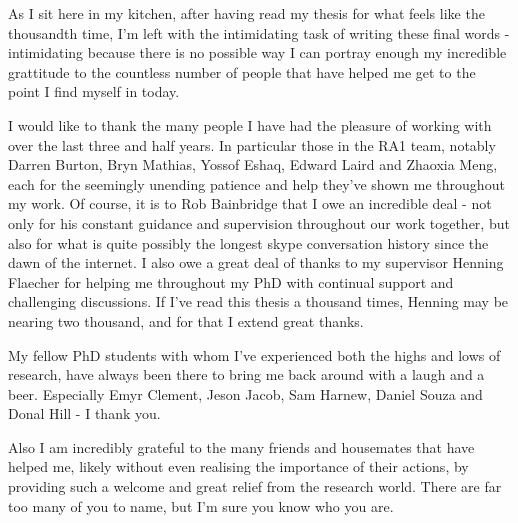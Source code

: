 
\begin{acknowledgements}      






\begin{spacing}{1}
As I sit here in my kitchen, after having read my thesis for what feels like
the
thousandth time, I'm left with the intimidating task of writing these final
words - intimidating because there is no possible way I can portray enough my
incredible grattitude to the countless number of people that have helped me
get to the point I find myself in today.

I would like to thank the many people I have had the pleasure of working with
over the last three and half years. In particular those in
the RA1 team, notably Darren Burton, Bryn Mathias, Yossof Eshaq, Edward
Laird and Zhaoxia Meng, each for the seemingly unending patience and help
they've shown me throughout my work. Of course, it is to Rob Bainbridge that I
owe an incredible deal - not only for his constant guidance and supervision
throughout our work together, but also for what is quite possibly the longest
skype conversation history since the dawn of the internet.
I also owe a great deal of thanks to my supervisor Henning Flaecher for helping
me throughout my PhD with continual support and challenging discussions. If I've
read this thesis a thousand times, Henning may be nearing two thousand, and for
that I extend great thanks.

My fellow PhD students with whom I've experienced both the highs and lows of
research, have always been there to bring me back around with a laugh and a
beer. Especially Emyr Clement, Jeson Jacob, Sam Harnew, Daniel Souza and Donal
Hill - I thank you.

Also I am incredibly grateful to the many friends and housemates that have helped me, likely without
even realising the importance of their actions, by
providing such a welcome and great relief from the research world. There are
far too many of you to name, but I'm sure you know who you are.


\end{spacing}
\end{acknowledgements}
